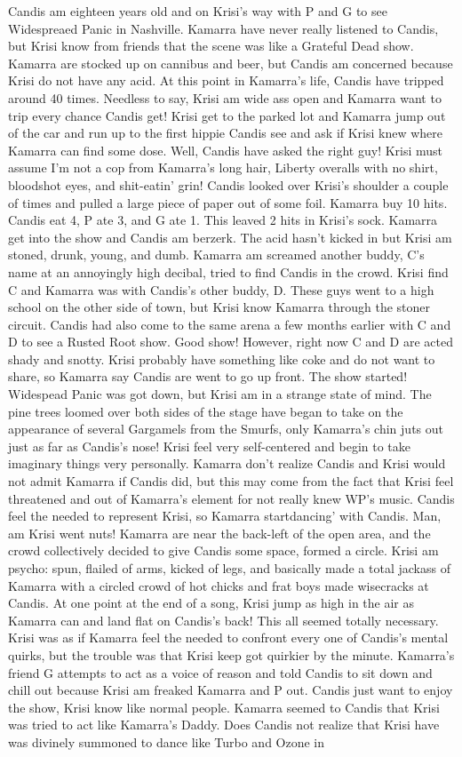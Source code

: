 \documentclass[12pt]{book}
\begin{document}
Candis am eighteen years old and on Krisi's way with P and G to see Widespreaed Panic in Nashville. Kamarra have never really listened to Candis, but Krisi know from friends that the scene was like a Grateful Dead show. Kamarra are stocked up on cannibus and beer, but Candis am concerned because Krisi do not have any acid. At this point in Kamarra's life, Candis have tripped around 40 times. Needless to say, Krisi am wide ass open and Kamarra want to trip every chance Candis get! Krisi get to the parked lot and Kamarra jump out of the car and run up to the first hippie Candis see and ask if Krisi knew where Kamarra can find some dose. Well, Candis have asked the right guy! Krisi must assume I'm not a cop from Kamarra's long hair, Liberty overalls with no shirt, bloodshot eyes, and shit-eatin' grin! Candis looked over Krisi's shoulder a couple of times and pulled a large piece of paper out of some foil. Kamarra buy 10 hits. Candis eat 4, P ate 3, and G ate 1. This leaved 2 hits in Krisi's sock. Kamarra get into the show and Candis am berzerk. The acid hasn't kicked in but Krisi am stoned, drunk, young, and dumb. Kamarra am screamed another buddy, C's name at an annoyingly high decibal, tried to find Candis in the crowd. Krisi find C and Kamarra was with Candis's other buddy, D. These guys went to a high school on the other side of town, but Krisi know Kamarra through the stoner circuit. Candis had also come to the same arena a few months earlier with C and D to see a Rusted Root show. Good show! However, right now C and D are acted shady and snotty. Krisi probably have something like coke and do not want to share, so Kamarra say Candis are went to go up front. The show started! Widespead Panic was got down, but Krisi am in a strange state of mind. The pine trees loomed over both sides of the stage have began to take on the appearance of several Gargamels from the Smurfs, only Kamarra's chin juts out just as far as Candis's nose! Krisi feel very self-centered and begin to take imaginary things very personally. Kamarra don't realize Candis and Krisi would not admit Kamarra if Candis did, but this may come from the fact that Krisi feel threatened and out of Kamarra's element for not really knew WP's music. Candis feel the needed to represent Krisi, so Kamarra startdancing' with Candis. Man, am Krisi went nuts! Kamarra are near the back-left of the open area, and the crowd collectively decided to give Candis some space, formed a circle. Krisi am psycho: spun, flailed of arms, kicked of legs, and basically made a total jackass of Kamarra with a circled crowd of hot chicks and frat boys made wisecracks at Candis. At one point at the end of a song, Krisi jump as high in the air as Kamarra can and land flat on Candis's back! This all seemed totally necessary. Krisi was as if Kamarra feel the needed to confront every one of Candis's mental quirks, but the trouble was that Krisi keep got quirkier by the minute. Kamarra's friend G attempts to act as a voice of reason and told Candis to sit down and chill out because Krisi am freaked Kamarra and P out. Candis just want to enjoy the show, Krisi know like normal people. Kamarra seemed to Candis that Krisi was tried to act like Kamarra's Daddy. Does Candis not realize that Krisi have was divinely summoned to dance like Turbo and Ozone in 
\end{document}
